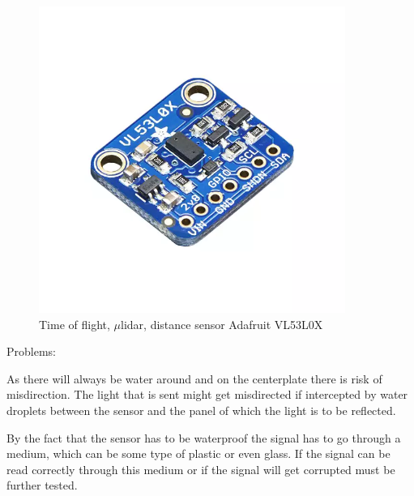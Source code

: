 \begin{figure}[H]
	\centering %
	\includegraphics[width = 10cm]{Figures/Adafruit_height_sensor.png}
	\caption{Time of flight, $\mu$\gls{lidar}, distance sensor Adafruit VL53L0X}
	\label{micro_lidar}
\end{figure}
Problems: %

As there will always be water around and on the centerplate there is risk of misdirection. The light that is sent might get misdirected if intercepted by water droplets between the sensor and the panel of which the light is to be reflected. %

By the fact that the sensor has to be waterproof the signal has to go through a medium, which can be some type of plastic or even glass.  
If the signal can be read correctly through this medium or if the signal will get corrupted must be further tested. %
